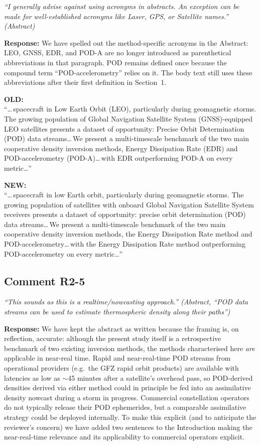 \documentclass[11pt]{article}
\newcommand{\reviewercomment}[1]{%
  \medskip
  \noindent\textit{\color{reviewblue}#1}%
  \medskip
}
\newcommand{\oldtext}[1]{%
  \smallskip
  \noindent\hspace{1em}\begin{minipage}{0.92\textwidth}%
  \color{quotegray}\textbf{OLD:}\\[2pt]``#1''%
  \end{minipage}%
  \smallskip
}
\newcommand{\newtext}[1]{%
  \smallskip
  \noindent\hspace{1em}\begin{minipage}{0.92\textwidth}%
  \color{quotegreen}\textbf{NEW:}\\[2pt]``#1''%
  \end{minipage}%
  \smallskip
}
\begin{document}
\reviewercomment{%
``I generally advise against using acronyms in abstracts. An exception can
be made for well-established acronyms like Laser, GPS, or Satellite names.''
(Abstract)}

\textbf{Response:}
We have spelled out the method-specific acronyms in the Abstract:
LEO, GNSS, EDR, and POD-A are no longer introduced as parenthetical
abbreviations in that paragraph. POD remains defined once because the
compound term ``POD-accelerometry'' relies on it. The body text still
uses these abbreviations after their first definition in Section~1.

\oldtext{\dots\,spacecraft in Low Earth Orbit (LEO), particularly during geomagnetic storms. The growing population of Global Navigation Satellite System (GNSS)-equipped LEO satellites presents a dataset of opportunity: Precise Orbit Determination (POD) data streams\dots\,We present a multi-timescale benchmark of the two main cooperative density inversion methods, Energy Dissipation Rate (EDR) and POD-accelerometry (POD-A)\dots\,with EDR outperforming POD-A on every metric\dots}

\newtext{\dots\,spacecraft in low Earth orbit, particularly during geomagnetic storms. The growing population of satellites with onboard Global Navigation Satellite System receivers presents a dataset of opportunity: precise orbit determination (POD) data streams\dots\,We present a multi-timescale benchmark of the two main cooperative density inversion methods, the Energy Dissipation Rate method and POD-accelerometry\dots\,with the Energy Dissipation Rate method outperforming POD-accelerometry on every metric\dots}


\subsection{Comment R2-5}

\reviewercomment{%
``This sounds as this is a realtime/nowcasting approach.'' (Abstract,
``POD data streams can be used to estimate thermospheric density along
their paths'')}

\textbf{Response:}
We have kept the abstract as written because the framing is, on
reflection, accurate: although the present study itself is a
retrospective benchmark of two existing inversion methods, the methods
characterised here \emph{are} applicable in near-real time. Rapid and
near-real-time POD streams from operational providers (e.g.\ the
GFZ rapid orbit products) are available with latencies as low as
$\sim$45 minutes after a satellite's overhead pass, so POD-derived
densities derived via either method could in principle be fed into an
assimilative density nowcast during a storm in progress. Commercial
constellation operators do not typically release their POD ephemerides,
but a comparable assimilative strategy could be deployed internally.
To make this explicit (and to anticipate the reviewer's concern) we have
added two sentences to the Introduction making the near-real-time
relevance and its applicability to commercial operators explicit.
\end{document}

